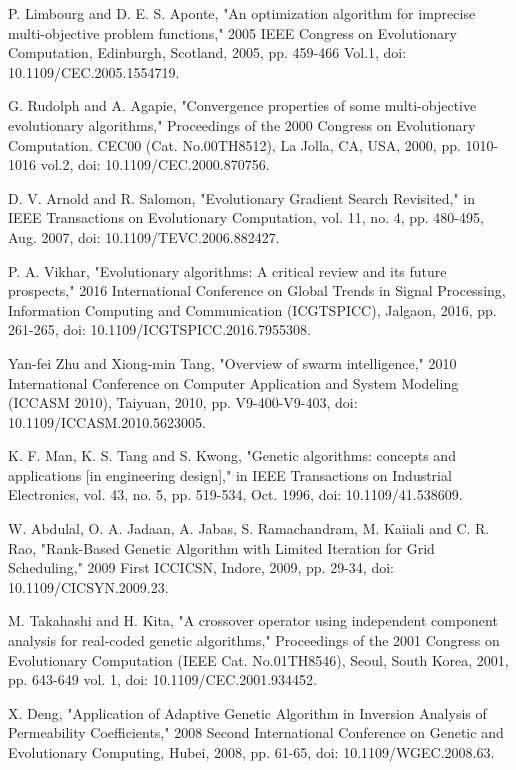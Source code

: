 \documentclass[conference]{IEEEtran}
\begin{document}
\begin{thebibliography}{00}
 P. Limbourg and D. E. S. Aponte, "An optimization algorithm for imprecise multi-objective problem functions," 2005 IEEE Congress on Evolutionary Computation, Edinburgh, Scotland, 2005, pp. 459-466 Vol.1, doi: 10.1109/CEC.2005.1554719.

 G. Rudolph and A. Agapie, "Convergence properties of some multi-objective evolutionary algorithms," Proceedings of the 2000 Congress on Evolutionary Computation. CEC00 (Cat. No.00TH8512), La Jolla, CA, USA, 2000, pp. 1010-1016 vol.2, doi: 10.1109/CEC.2000.870756.

 D. V. Arnold and R. Salomon, "Evolutionary Gradient Search Revisited," in IEEE Transactions on Evolutionary Computation, vol. 11, no. 4, pp. 480-495, Aug. 2007, doi: 10.1109/TEVC.2006.882427.

 P. A. Vikhar, "Evolutionary algorithms: A critical review and its future prospects," 2016 International Conference on Global Trends in Signal Processing, Information Computing and Communication (ICGTSPICC), Jalgaon, 2016, pp. 261-265, doi: 10.1109/ICGTSPICC.2016.7955308.

 Yan-fei Zhu and Xiong-min Tang, "Overview of swarm intelligence," 2010 International Conference on Computer Application and System Modeling (ICCASM 2010), Taiyuan, 2010, pp. V9-400-V9-403, doi: 10.1109/ICCASM.2010.5623005.

 K. F. Man, K. S. Tang and S. Kwong, "Genetic algorithms: concepts and applications [in engineering design]," in IEEE Transactions on Industrial Electronics, vol. 43, no. 5, pp. 519-534, Oct. 1996, doi: 10.1109/41.538609.

 W. Abdulal, O. A. Jadaan, A. Jabas, S. Ramachandram, M. Kaiiali and C. R. Rao, "Rank-Based Genetic Algorithm with Limited Iteration for Grid Scheduling," 2009 First ICCICSN, Indore, 2009, pp. 29-34, doi: 10.1109/CICSYN.2009.23.

 M. Takahashi and H. Kita, "A crossover operator using independent component analysis for real-coded genetic algorithms," Proceedings of the 2001 Congress on Evolutionary Computation (IEEE Cat. No.01TH8546), Seoul, South Korea, 2001, pp. 643-649 vol. 1, doi: 10.1109/CEC.2001.934452.

 X. Deng, "Application of Adaptive Genetic Algorithm in Inversion Analysis of Permeability Coefficients," 2008 Second International Conference on Genetic and Evolutionary Computing, Hubei, 2008, pp. 61-65, doi: 10.1109/WGEC.2008.63.


\end{thebibliography}
\end{document}
